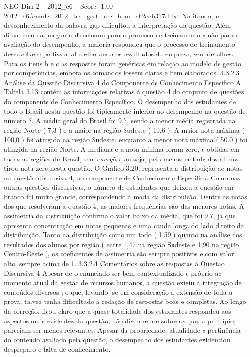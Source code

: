\begin{textsample}{NEG Dim 2 – 2012\_c6 – Score -1.00 – 2012\_c6/enade\_2012\_tec\_gest\_rec\_hum\_c62ecb317d.txt}
No item a, o desconhecimento da palavra gap dificultou a interpretação da questão.
Além disso, como a pergunta direcionou para o processo de treinamento e não para a avaliação do desempenho, a maioria respondeu que o processo de treinamento desenvolve o profissional melhorando os resultados da empresa, sem detalhes.
Para os itens b e c as respostas foram genéricas em relação ao modelo de gestão por competências, embora os comandos fossem claros e bem elaborados. 3.3.2.3 Análise da Questão Discursiva 4 do Componente de Conhecimento Específico A Tabela 3.13 contém as informações relativas à questão 4 do conjunto de questões do componente de Conhecimento Específico.
O desempenho dos estudantes de todo o Brasil nesta questão foi tipicamente inferior ao desempenho na questão de número 3.
A média geral do Brasil foi 9,7, sendo a menor média registrada na região Norte ( 7,3 ) e a maior na região Sudeste ( 10,6 ).
A maior nota máxima ( 100,0 ) foi atingida na região Sudeste, enquanto a menor nota máxima ( 50,0 ) foi atingida na região Norte.
A mediana e a nota mínima foram zero, e obtidas em todas as regiões do Brasil, sem exceção, ou seja, pelo menos metade dos alunos tirou nota zero nesta questão.
O Gráfico 3.20, representa a distribuição de notas na questão discursiva 4, no componente de Conhecimento Específico.
Como nas outras questões discursivas, o número de estudantes que deixou a questão em branco foi muito grande, correspondendo à moda da distribuição.
Dentre as notas dos que resolveram a questão 4, as maiores frequências são das menores notas.
A assimetria da distribuição confirma o valor baixo da média, que foi 9,7, já que apresenta concentração em notas pequenas e uma cauda longa do lado direito da distribuição.
Tanto na distribuição como um todo ( 1,59 ) quanto na análise dos resultados dos alunos por região ( entre 1,47 na região Sudeste e 1,90 na região Centro-Oeste ), os coeficientes de assimetria são sempre positivos e com valor alto, sempre acima de 1. 3.3.2.4 Comentários sobre as respostas à Questão Discursiva 4 Apesar de o enunciado ser bem contextualizado e próprio ao momento atual da gestão de recursos humanos, a questão exigiu a integração de conteúdos diversos ; o que, levando -se em consideração a extensão de toda a prova, talvez tenha dificultado a redação de respostas boas e completas.
Ao longo da correção, ficou claro que a quase totalidade dos estudantes respondeu aos aspectos mais evidentes da questão, não discorrendo sobre os que, a princípio, pareciam ser menos relevantes.
Apesar da propriedade, atualidade e pertinência do conteúdo avaliado pela questão, o desempenho dos estudantes evidenciou despreparo e falta de conhecimento.

\end{textsample}
